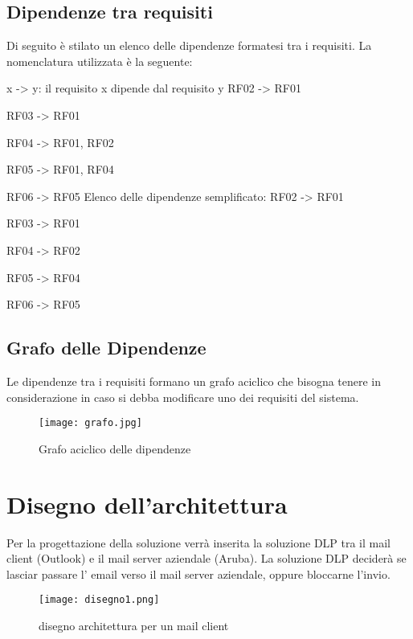         \subsection{Dipendenze tra requisiti}
        Di seguito è stilato un elenco delle dipendenze formatesi tra i requisiti.
        La nomenclatura utilizzata è la seguente:
        \begin{flushleft}
          x -> y: il requisito x dipende dal requisito y
          \newline
          \newline
          RF02 -> RF01

          RF03 -> RF01

          RF04 -> RF01, RF02

          RF05 -> RF01, RF04

          RF06 -> RF05
          \newline
          \newline
          Elenco delle dipendenze semplificato: 
          \newline
          \newline
          RF02 -> RF01

          RF03 -> RF01

          RF04 -> RF02

          RF05 -> RF04 
          
          RF06 -> RF05
        \end{flushleft}

        \newpage
        \subsection{Grafo delle Dipendenze}
        Le dipendenze tra i requisiti formano un grafo aciclico che bisogna tenere in considerazione in caso si debba modificare uno dei requisiti del sistema.

        \begin{figure}[htp]
          \centering
          \texttt{[image: grafo.jpg]}
          \caption{Grafo aciclico delle dipendenze}\label{grafoDipendenze}
        \end{figure}

\section{Disegno dell'architettura}

  Per la progettazione della soluzione verrà inserita la soluzione DLP
  tra il mail client (Outlook) e il mail server aziendale (Aruba). La soluzione DLP deciderà se lasciar 
  passare l' email verso il mail server aziendale, oppure bloccarne l'invio.
  \begin{figure}[htp]
    \centering
    \texttt{[image: disegno1.png]}
    \caption{disegno architettura per un mail client}\label{disegno1}
  \end{figure}

